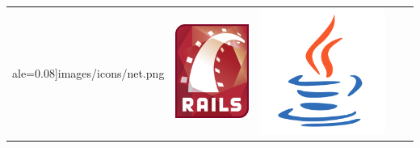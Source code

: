 \documentclass[a4paper,12pt,openany,oneside]{book}
\begin{document}
\begin{table}[!ht]
\begin{tabular}{| l | l | l | l | l |}
ale=0.08]{images/icons/net.png} & \includegraphics[scale=0.51]{images/icons/ruby-on-rails.png} & \includegraphics[scale=0.1]{images/icons/java.png}\\

\end{tabular}
\end{table}
\end{document}
